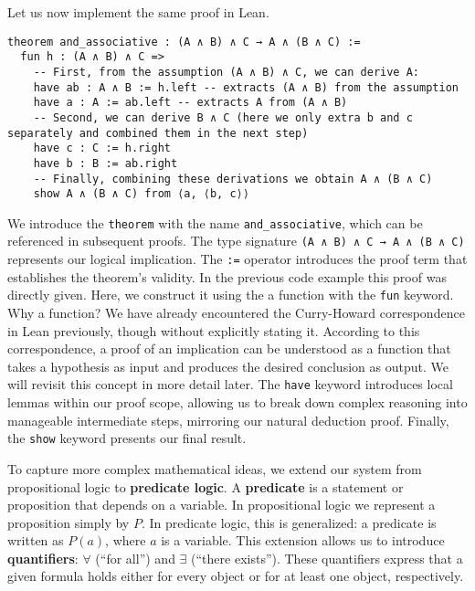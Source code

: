 \begin{example}
Let us now implement the same proof in Lean.
\begin{lstlisting}[language=Lean, caption=Associativity of Conjunction in Lean]
theorem and_associative : (A ∧ B) ∧ C → A ∧ (B ∧ C) :=
  fun h : (A ∧ B) ∧ C =>
    -- First, from the assumption (A ∧ B) ∧ C, we can derive A:
    have ab : A ∧ B := h.left -- extracts (A ∧ B) from the assumption
    have a : A := ab.left -- extracts A from (A ∧ B)
    -- Second, we can derive B ∧ C (here we only extra b and c separately and combined them in the next step) 
    have c : C := h.right
    have b : B := ab.right
    -- Finally, combining these derivations we obtain A ∧ (B ∧ C)
    show A ∧ (B ∧ C) from ⟨a, ⟨b, c⟩⟩
\end{lstlisting}
We introduce the \lstinline[language=lean]|theorem| with the name 
\lstinline[language=lean]|and_associative|, 
which can be referenced in subsequent proofs. 
The type signature \lstinline[language=lean]|(A ∧ B) ∧ C → A ∧ (B ∧ C)| 
represents our logical implication.
The \lstinline[language=lean]|:=| operator introduces the 
proof term that establishes the theorem's validity. 
In the previous code example this proof was directly given.
Here, we construct it using the a function with the \lstinline[language=lean]|fun| keyword. 
Why a function? We have already encountered the Curry-Howard correspondence in Lean 
previously, though without explicitly stating it. 
According to this correspondence, a proof of an implication can be 
understood as a function that takes a hypothesis as input and produces 
the desired conclusion as output. We will revisit this concept in more 
detail later.
The \lstinline[language=lean]|have| keyword introduces local 
lemmas within our proof scope, allowing us to break down complex 
reasoning into manageable intermediate steps, mirroring our natural deduction proof.
Finally, the \lstinline[language=lean]|show| keyword presents our final result. 
\end{example}

To capture more complex mathematical ideas, we extend our system from 
propositional logic to \textbf{predicate logic}.  
A \textbf{predicate} is a statement or proposition that depends on a variable.
In propositional logic we represent a proposition simply by $P$.  
In predicate logic, this is generalized: a predicate is written as $P(a)$, 
where $a$ is a variable.
This extension allows us to introduce \textbf{quantifiers}:  
$\forall$ (``for all'') and $\exists$ (``there exists'').  
These quantifiers express that a given formula holds either for every object 
or for at least one object, respectively. 

